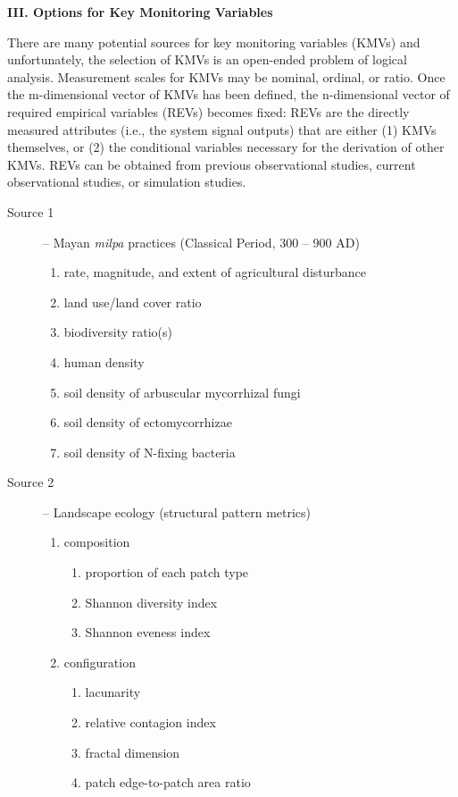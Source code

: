 \documentclass[12pt]{article}
\begin{document}
\vspace{5mm}
\centerline{\textbf{III. Options for Key Monitoring Variables}}
There are many potential sources for key monitoring variables (KMVs) and unfortunately, the selection of KMVs is an open-ended problem of logical analysis. Measurement scales for KMVs may be nominal, ordinal, or ratio. Once the m-dimensional vector of  KMVs has been defined, the n-dimensional vector of required empirical variables (REVs) becomes fixed: REVs are the directly measured attributes (i.e., the system signal outputs) that are either (1) KMVs themselves, or (2) the conditional variables necessary for the derivation of other KMVs. REVs can be obtained from previous observational studies, current observational studies, or simulation studies.
\begin{description}
	\item[Source 1] -- Mayan \textit{milpa} practices (Classical Period, 300 -- 900 AD)
	\begin{enumerate}
		\item rate, magnitude, and extent of agricultural disturbance 
		\item land use/land cover ratio 
		\item biodiversity ratio(s) 
		\item human density
		\item soil density of arbuscular mycorrhizal fungi
		\item soil density of ectomycorrhizae 
		\item soil density of N-fixing bacteria 
	\end{enumerate}
	\item[Source 2] -- Landscape ecology (structural pattern metrics) 
	\begin{enumerate}
		\item composition
		\begin{enumerate}
			\item proportion of each patch type
			\item Shannon diversity index
			\item Shannon eveness index 
		\end{enumerate}
		\item configuration 
		\begin{enumerate}
			\item lacunarity 
			\item relative contagion index
			\item fractal dimension
			\item patch edge-to-patch area ratio

\end{enumerate}
\end{enumerate}
\end{description}
\end{document}
